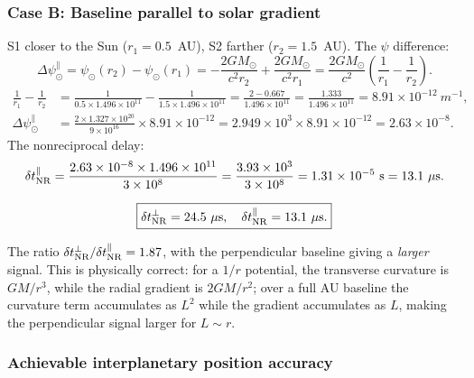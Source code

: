 \documentclass[aps,prd,twocolumn,superscriptaddress,nofootinbib,longbibliography]{revtex4-2}
\begin{document}
\subsubsection{Case B: Baseline parallel to solar gradient}

S1 closer to the Sun ($r_1 = 0.5$~AU), S2 farther ($r_2 = 1.5$~AU).
The $\psi$ difference:
\begin{equation}
\Delta\psi_\odot^{\parallel}
= \psi_\odot(r_2) - \psi_\odot(r_1)
= -\frac{2GM_\odot}{c^2 r_2} + \frac{2GM_\odot}{c^2 r_1}
= \frac{2GM_\odot}{c^2}\left(\frac{1}{r_1} - \frac{1}{r_2}\right).
\end{equation}
\begin{align}
\frac{1}{r_1} - \frac{1}{r_2} &= \frac{1}{0.5\times1.496\times10^{11}} - \frac{1}{1.5\times1.496\times10^{11}}
= \frac{2 - 0.667}{1.496\times10^{11}} = \frac{1.333}{1.496\times10^{11}} = 8.91\times10^{-12}\ \si{m^{-1}}, \nonumber\\
\Delta\psi_\odot^{\parallel} &= \frac{2\times1.327\times10^{20}}{9\times10^{16}}\times8.91\times10^{-12}
= 2.949\times10^3\times8.91\times10^{-12} = 2.63\times10^{-8}.
\end{align}
The nonreciprocal delay:
\begin{equation}
\delta t_{\rm NR}^{\parallel}
= \frac{2.63\times10^{-8}\times1.496\times10^{11}}{3\times10^8}
= \frac{3.93\times10^{3}}{3\times10^8}
= 1.31\times10^{-5}\ \si{s} = 13.1\ \mu\si{s}.
\end{equation}

\begin{equation}
\boxed{
\delta t_{\rm NR}^{\perp} = 24.5\ \mu\si{s},
\quad
\delta t_{\rm NR}^{\parallel} = 13.1\ \mu\si{s}.
}
\end{equation}

The ratio $\delta t_{\rm NR}^{\perp}/\delta t_{\rm NR}^{\parallel} = 1.87$,
with the perpendicular baseline giving a \emph{larger} signal.
This is physically correct: for a $1/r$ potential, the transverse
curvature is $GM/r^3$, while the radial gradient is $2GM/r^2$;
over a full AU baseline the curvature term accumulates as $L^2$
while the gradient accumulates as $L$, making the perpendicular
signal larger for $L\sim r$.

\subsubsection{Achievable interplanetary position accuracy}
\end{document}

